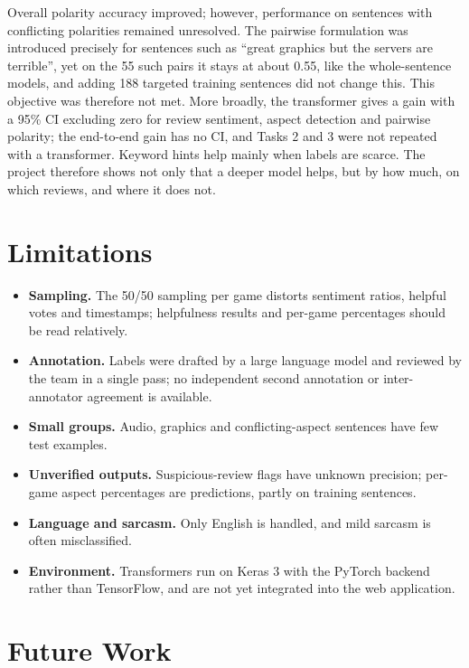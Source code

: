 Overall polarity accuracy improved; however, performance on sentences with conflicting polarities remained unresolved. The pairwise formulation was introduced precisely for sentences such as ``great graphics but the servers are terrible'', yet on the 55 such pairs it stays at about 0.55, like the whole-sentence models, and adding 188 targeted training sentences did not change this. This objective was therefore not met. More broadly, the transformer gives a gain with a 95\% CI excluding zero for review sentiment, aspect detection and pairwise polarity; the end-to-end gain has no CI, and Tasks 2 and 3 were not repeated with a transformer. Keyword hints help mainly when labels are scarce. The project therefore shows not only that a deeper model helps, but by how much, on which reviews, and where it does not.

\section{Limitations}

\begin{itemize}
    \item \textbf{Sampling.} The 50/50 sampling per game distorts sentiment ratios, helpful votes and timestamps; helpfulness results and per-game percentages should be read relatively.
    \item \textbf{Annotation.} Labels were drafted by a large language model and reviewed by the team in a single pass; no independent second annotation or inter-annotator agreement is available.
    \item \textbf{Small groups.} Audio, graphics and conflicting-aspect sentences have few test examples.
    \item \textbf{Unverified outputs.} Suspicious-review flags have unknown precision; per-game aspect percentages are predictions, partly on training sentences.
    \item \textbf{Language and sarcasm.} Only English is handled, and mild sarcasm is often misclassified.
    \item \textbf{Environment.} Transformers run on Keras 3 with the PyTorch backend rather than TensorFlow, and are not yet integrated into the web application.
\end{itemize}

\section{Future Work}

